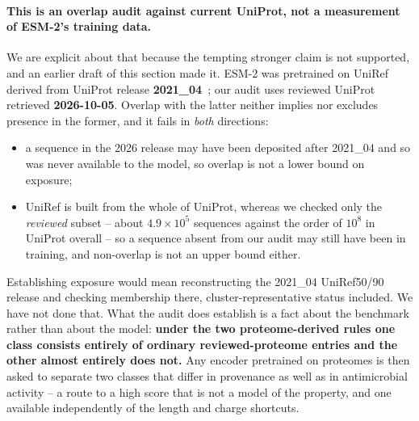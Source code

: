 \documentclass[11pt,a4paper]{article}
\begin{document}
\paragraph{This is an overlap audit against current UniProt, not a measurement of ESM-2's
training data.} We are explicit about that because the tempting stronger claim is not
supported, and an earlier draft of this section made it. ESM-2 was pretrained on UniRef
derived from UniProt release \textbf{2021\_04}~\citep{lin2023esm2}; our audit uses reviewed
UniProt retrieved \textbf{2026-10-05}. Overlap with the latter neither implies nor excludes
presence in the former, and it fails in \emph{both} directions:

\begin{itemize}[leftmargin=1.4em,itemsep=1pt]
\item a sequence in the 2026 release may have been deposited after 2021\_04 and so was never
  available to the model, so overlap is not a lower bound on exposure;
\item UniRef is built from the whole of UniProt, whereas we checked only the \emph{reviewed}
  subset -- about $4.9\times10^{5}$ sequences against the order of $10^{8}$ in UniProt
  overall -- so a sequence absent from our audit may still have been in training, and
  non-overlap is not an upper bound either.
\end{itemize}

Establishing exposure would mean reconstructing the 2021\_04 UniRef50/90 release and
checking membership there, cluster-representative status included. We have not done that.
What the audit does establish is a fact about the benchmark rather than about the model:
\textbf{under the two proteome-derived rules one class consists entirely of ordinary
reviewed-proteome entries and the other almost entirely does not.} Any encoder pretrained
on proteomes is then asked to separate two classes that differ in provenance as well as in
antimicrobial activity -- a route to a high score that is not a model of the property, and
one available independently of the length and charge shortcuts.
\end{document}
